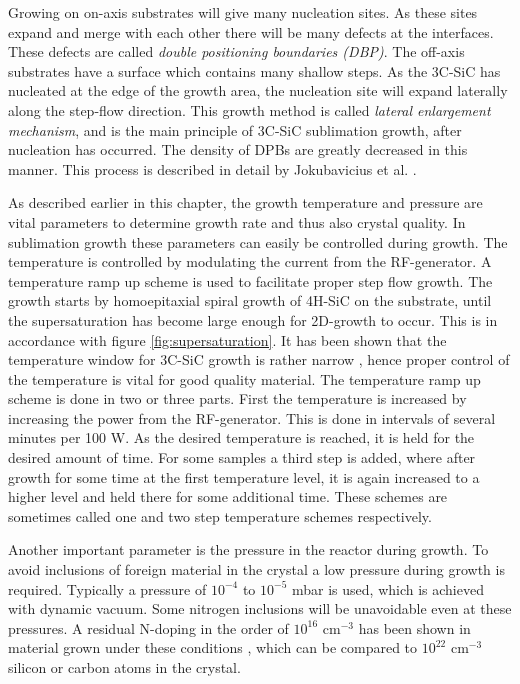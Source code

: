 Growing on on-axis substrates will give many nucleation sites. As these sites expand and merge with each other there will be many defects at the interfaces. These defects are called \emph{double positioning boundaries (DBP)}. The off-axis substrates have a surface which contains many shallow steps. As the 3C-SiC has nucleated at the edge of the growth area, the nucleation site will expand laterally along the step-flow direction. This growth method is called \emph{lateral enlargement mechanism}, and is the main principle of 3C-SiC sublimation growth, after nucleation has occurred. The density of DPBs are greatly decreased in this manner. This process is described in detail by Jokubavicius et al. \cite{Jokubavicius2014}.

As described earlier in this chapter, the growth temperature and pressure are vital parameters to determine growth rate and thus also crystal quality. In sublimation growth these parameters can easily be controlled during growth. The temperature is controlled by modulating the current from the RF-generator. A temperature ramp up scheme is used to facilitate proper step flow growth. The growth starts by homoepitaxial spiral growth of 4H-SiC on the substrate, until the supersaturation has become large enough for 2D-growth to occur. This is in accordance with figure \ref{fig:supersaturation}. It has been shown that the temperature window for 3C-SiC growth is rather narrow \cite{Vasiliauskas2012}, hence proper control of the temperature is vital for good quality material. The temperature ramp up scheme is done in two or three parts. First the temperature is increased by increasing the power from the RF-generator. This is done in intervals of several minutes per 100 W. As the desired temperature is reached, it is held for the desired amount of time. For some samples a third step is added, where after growth for some time at the first temperature level, it is again increased to a higher level and held there for some additional time. These schemes are sometimes called one and two step temperature schemes respectively. 

Another important parameter is the pressure in the reactor during growth. To avoid inclusions of foreign material in the crystal a low pressure during growth is required. Typically a pressure of $10^{-4}$ to $10^{-5}$ mbar is used, which is achieved with dynamic vacuum. Some nitrogen inclusions will be unavoidable even at these pressures. A residual N-doping in the order of $10^{16}$ cm$^{-3}$ has been shown in material grown under these conditions \cite{Jokubavicius2014}, which can be compared to $10^{22}$ cm$^{-3}$ silicon or carbon atoms in the crystal. 

